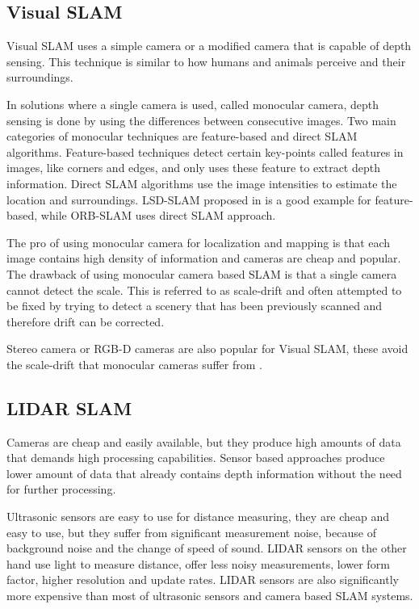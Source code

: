 \subsection{Visual SLAM}
Visual SLAM uses a simple camera or a modified camera that is capable of depth sensing. This technique is 
similar to how humans and animals perceive and their surroundings. 

In solutions where a single camera is used, called monocular camera, depth sensing is done by using the differences
between consecutive images. 
Two main categories of monocular techniques are feature-based and direct SLAM algorithms. Feature-based techniques detect
certain key-points called features in images, like corners and edges, and only uses these feature to extract depth information.
Direct SLAM algorithms use the image intensities to estimate the location and surroundings.
LSD-SLAM proposed in \cite{engel2014lsd} is a good example for feature-based, while ORB-SLAM\cite{mur2015orb} uses direct SLAM 
approach.

The pro of using monocular camera for localization and mapping is that each image contains high density of information and
cameras are cheap and popular.
The drawback of using monocular camera based SLAM is that a single camera cannot detect the scale. This is referred to as
scale-drift and often attempted to be fixed by trying to detect a scenery that has been previously scanned and therefore 
drift can be corrected.

Stereo camera or RGB-D cameras are also popular for Visual SLAM, these avoid the scale-drift that monocular cameras suffer
from \cite{engel2015large}. 

\subsection{LIDAR SLAM}
Cameras are cheap and easily available, but they produce high amounts of data that demands high processing capabilities.
Sensor based approaches produce lower amount of data that already contains depth information without the need for further 
processing. 

Ultrasonic sensors are easy to use for distance measuring, they are cheap and easy to use, but they suffer from significant
measurement noise, because of background noise and the change of speed of sound. LIDAR sensors on the other hand 
use light to measure distance, offer less noisy measurements, lower form factor, higher resolution and update rates. LIDAR 
sensors are also significantly more expensive than most of ultrasonic sensors and camera based SLAM systems.


